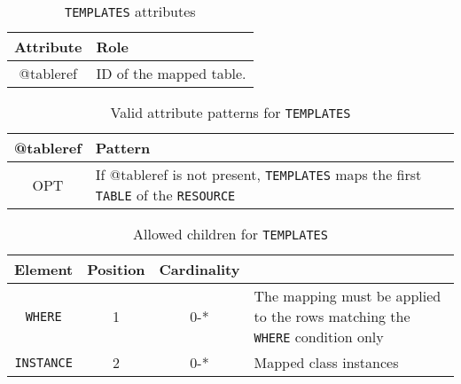 
\begin{table}[!htbp]
\small
\centering
\begin{tabulary}{\linewidth}{|c|J|}       
       \hline 
            \textbf{Attribute} & 
            \textbf {Role}\\
       \hline         \hline  
            @tableref & 
            ID of the mapped table.  \\
        \hline 
     \end{tabulary}
     \caption{\texttt{TEMPLATES} attributes} 
     \label{tbl:templates-att}
 \end{table}

\begin{table}[!htbp]
\small
\centering
\begin{tabulary}{\linewidth}{|c|J|}
    \hline 
        \textbf{@tableref} &
        \textbf{Pattern}\\
    \hline      \hline  
        OPT &           
        If @tableref is not present, \texttt{TEMPLATES} maps the first \texttt{TABLE} of the \texttt{RESOURCE}\\
   \hline 
\end{tabulary}
     \caption{Valid attribute patterns for  \texttt{TEMPLATES}} 
     \label{tbl:templates-pattern}
 \end{table}

\begin{table}[!htbp]
\small
\centering
\begin{tabulary}{\linewidth}{|c |c |c|J|}
    \hline 
        \textbf{Element} &
        \textbf{Position} &
        \textbf{Cardinality} &
        \\
    \hline      \hline  
        \texttt{WHERE}  &        
        1 &           
        0-* &
        The mapping must be applied to the rows matching the \texttt{WHERE} condition only\\
    \hline    
        \texttt{INSTANCE} &           
        2 &           
        0-* &
        Mapped class instances\\
    \hline 
\end{tabulary}
     \caption{Allowed children for \texttt{TEMPLATES}} 
     \label{tbl:templates-chilren}
 \end{table}